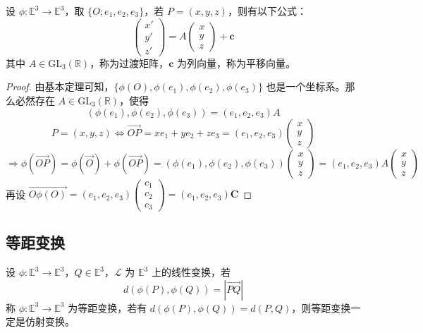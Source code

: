 \documentclass[lang=cn,10pt,thmcnt=section]{elegantbook}
\begin{document}
    \begin{theorem}[仿射变换的坐标]\label{thm:affine_coordinates}
        设 $\phi: \mathbb{E}^3 \rightarrow \mathbb{E}^3$，取 $\{O; e_1, e_2, e_3\}$，若 $P = (x, y, z)$，则有以下公式：
        \[
        \begin{pmatrix}
        x' \\
        y' \\
        z'
        \end{pmatrix}
        =
        A
        \begin{pmatrix}
        x \\
        y \\
        z
        \end{pmatrix}
        + \mathbf{c}
        \]
        其中 $A \in \text{GL}_3(\mathbb{R})$，称为过渡矩阵，$\mathbf{c}$ 为列向量，称为平移向量。
        \end{theorem}
        
        \begin{proof}
        由基本定理可知，$\{\phi(O), \phi(e_1), \phi(e_2), \phi(e_3)\}$ 也是一个坐标系。那么必然存在 $A \in \text{GL}_3(\mathbb{R})$，使得
        \[
        (\phi(e_1), \phi(e_2), \phi(e_3)) = (e_1, e_2, e_3) A
        \]
        \[
        P = (x, y, z) \Leftrightarrow \overrightarrow{OP} = x e_1 + y e_2 + z e_3 = (e_1, e_2, e_3) \begin{pmatrix} x \\ y \\ z \end{pmatrix}
        \]
        \[
        \Rightarrow \phi(\overrightarrow{OP}) = \phi(\overrightarrow{O}) + \phi(\overrightarrow{OP}) = (\phi(e_1), \phi(e_2), \phi(e_3)) \begin{pmatrix} x \\ y \\ z \end{pmatrix} = (e_1, e_2, e_3) A \begin{pmatrix} x \\ y \\ z \end{pmatrix}
        \]
        再设 $\overrightarrow{O\phi(O)} = (e_1, e_2, e_3) \begin{pmatrix} c_1 \\ c_2 \\ c_3 \end{pmatrix} = (e_1, e_2, e_3) \mathbf{C}$
        \end{proof}
    \subsection{等距变换}
    \begin{definition}[等距变换]
        设 $\phi: \mathbb{E}^3 \to \mathbb{E}^3$，$Q \in \mathbb{E}^3$，$\mathcal{L}$ 为 $\mathbb{E}^3$ 上的线性变换，若
        \[
        d(\phi(P), \phi(Q)) = |\overrightarrow{PQ}|
        \]
        称 $\phi: \mathbb{E}^3 \to \mathbb{E}^3$ 为等距变换，若有 $d(\phi(P), \phi(Q)) = d(P, Q)$，则等距变换一定是仿射变换。
        \end{definition}
        
\end{document}
